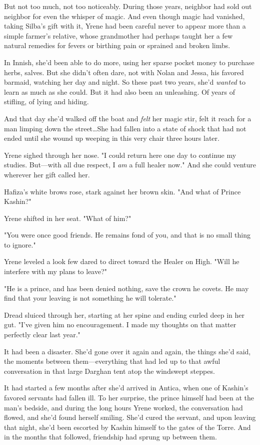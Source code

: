 But not too much, not too noticeably.
During those years, neighbor had sold out neighbor for even the whisper of magic.
And even though magic had vanished, taking Silba's gift with it, Yrene had been careful never to appear more than a simple farmer's relative, whose grandmother had perhaps taught her a few natural remedies for fevers or birthing pain or sprained and broken limbs.

In Innish, she'd been able to do more, using her sparse pocket money to purchase herbs, salves.
But she didn't often dare, not with Nolan and Jessa, his favored barmaid, watching her day and night.
So these past two years, she'd \emph{wanted} to learn as much as she could.
But it had also been an unleashing.
Of years of stifling, of lying and hiding.

And that day she'd walked off the boat and \emph{felt} her magic stir, felt it reach for a man limping down the street\ldots She had fallen into a state of shock that had not ended until she wound up weeping in this very chair three hours later.

Yrene sighed through her nose.
"I could return here one day to continue my studies.
But---with all due respect, I \emph{am} a full healer now."
And she could venture wherever her gift called her.

Hafiza's white brows rose, stark against her brown skin.
"And what of Prince Kashin?"

Yrene shifted in her seat.
"What of him?"

"You were once good friends.
He remains fond of you, and that is no small thing to ignore."

Yrene leveled a look few dared to direct toward the Healer on High.
"Will he interfere with my plans to leave?"

"He is a prince, and has been denied nothing, save the crown he covets.
He may find that your leaving is not something he will tolerate."

Dread sluiced through her, starting at her spine and ending curled deep in her gut.
"I've given him no encouragement.
I made my thoughts on that matter perfectly clear last year."

It had been a disaster.
She'd gone over it again and again, the things she'd said, the moments between them---everything that had led up to that awful conversation in that large Darghan tent atop the windswept steppes.

It had started a few months after she'd arrived in Antica, when one of Kashin's favored servants had fallen ill.
To her surprise, the prince himself had been at the man's bedside, and during the long hours Yrene worked, the conversation had flowed, and she'd found herself smiling.
She'd cured the servant, and upon leaving that night, she'd been escorted by Kashin himself to the gates of the Torre.
And in the months that followed, friendship had sprung up between them.

